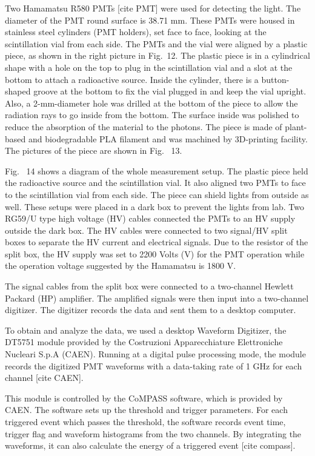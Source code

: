 Two Hamamatsu R580 PMTs [cite PMT] were used for detecting the light. The diameter of the PMT round surface is 38.71 mm. These PMTs were housed in stainless steel cylinders (PMT holders), set face to face, looking at the scintillation vial from each side. The PMTs and the vial were aligned by a plastic piece, as shown in the right picture in Fig.~12.  The plastic piece is in a cylindrical shape with a hole on the top to plug in the scintillation vial and a slot at the bottom to attach a radioactive source. Inside the cylinder, there is a button-shaped groove at the bottom to fix the vial plugged in and keep the vial upright. Also, a 2-mm-diameter hole was drilled at the bottom of the piece to allow the radiation rays to go inside from the bottom. The surface inside was polished to reduce the absorption of the material to the photons. The piece is made of plant-based and biodegradable PLA filament and was machined by 3D-printing facility. The pictures of the piece are shown in Fig.~ 13.

Fig.~ 14 shows a diagram of the whole measurement setup. The plastic piece held the radioactive source and the scintillation vial. It also aligned two PMTs to face to the scintillation vial from each side. The piece can shield lights from outside as well. These setups were placed in a dark box to prevent the lights from lab. Two RG59/U type high voltage (HV) cables connected the PMTs to an HV supply outside the dark box. The HV cables were connected to two signal/HV split boxes to separate the HV current and electrical signals. Due to the resistor of the split box, the HV supply was set to 2200 Volts (V) for the PMT operation while the operation voltage suggested by the Hamamatsu is 1800 V. 

The signal cables from the split box were connected to a two-channel Hewlett Packard (HP) amplifier. The amplified signals were then input into a two-channel digitizer. The digitizer records the data and sent them to a desktop computer.

To obtain and analyze the data, we used a desktop Waveform Digitizer, the DT5751 module provided by the Costruzioni Apparecchiature Elettroniche Nucleari S.p.A (CAEN). Running at a digital pulse processing mode, the module records the digitized PMT waveforms with a data-taking rate of 1 GHz for each channel [cite CAEN].

This module is controlled by the CoMPASS software, which is provided by CAEN. The software sets up the threshold and trigger parameters. For each triggered event which passes the threshold, the software records event time, trigger flag and waveform histograms from the two channels. By integrating the waveforms, it can also calculate the energy of a triggered event [cite compass].

